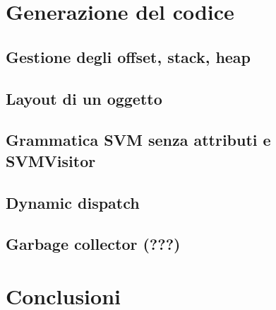 \documentclass[a4paper]{article}   %
\begin{document}

\section{Generazione del codice}

\subsection{Gestione degli offset, stack, heap}
\subsection{Layout di un oggetto}
\subsection{Grammatica SVM senza attributi e SVMVisitor}
\subsection{Dynamic dispatch}
\subsection{Garbage collector (???)}

\section{Conclusioni}

\end{document}
